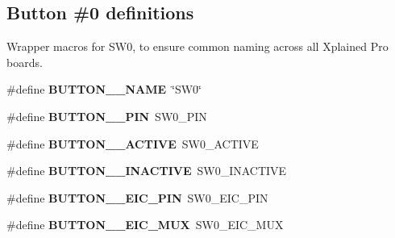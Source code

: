 \subsection*{Button \#0 definitions}
\label{_amgrpdb8ef24fb7da9ad0f7f88fb0a7d7347e}%
Wrapper macros for S\+W0, to ensure common naming across all Xplained Pro boards. \begin{DoxyCompactItemize}
\item 
\hypertarget{group__saml21__xplained__pro__features__group_ga20c6ec898ac72b49ab8e52d034ad1e2b}{}\#define {\bfseries B\+U\+T\+T\+O\+N\+\_\+\_\+\+N\+A\+M\+E}~\char`\"{}S\+W0\char`\"{}\label{group__saml21__xplained__pro__features__group_ga20c6ec898ac72b49ab8e52d034ad1e2b}

\item 
\hypertarget{group__saml21__xplained__pro__features__group_ga6cb077072b69f695f7bcc057da12919f}{}\#define {\bfseries B\+U\+T\+T\+O\+N\+\_\+\_\+\+P\+I\+N}~S\+W0\+\_\+\+P\+I\+N\label{group__saml21__xplained__pro__features__group_ga6cb077072b69f695f7bcc057da12919f}

\item 
\hypertarget{group__saml21__xplained__pro__features__group_gab2f863849e05ec54d451ac536f4b5031}{}\#define {\bfseries B\+U\+T\+T\+O\+N\+\_\+\_\+\+A\+C\+T\+I\+V\+E}~S\+W0\+\_\+\+A\+C\+T\+I\+V\+E\label{group__saml21__xplained__pro__features__group_gab2f863849e05ec54d451ac536f4b5031}

\item 
\hypertarget{group__saml21__xplained__pro__features__group_ga54119bf75db09e383bfd9c3571fc4efe}{}\#define {\bfseries B\+U\+T\+T\+O\+N\+\_\+\_\+\+I\+N\+A\+C\+T\+I\+V\+E}~S\+W0\+\_\+\+I\+N\+A\+C\+T\+I\+V\+E\label{group__saml21__xplained__pro__features__group_ga54119bf75db09e383bfd9c3571fc4efe}

\item 
\hypertarget{group__saml21__xplained__pro__features__group_gaa8d94c804e6a74a033e09e8267069fc5}{}\#define {\bfseries B\+U\+T\+T\+O\+N\+\_\+\_\+\+E\+I\+C\+\_\+\+P\+I\+N}~S\+W0\+\_\+\+E\+I\+C\+\_\+\+P\+I\+N\label{group__saml21__xplained__pro__features__group_gaa8d94c804e6a74a033e09e8267069fc5}

\item 
\hypertarget{group__saml21__xplained__pro__features__group_ga2b85ab2cdabcc349b8b6f9e8fa9ac119}{}\#define {\bfseries B\+U\+T\+T\+O\+N\+\_\+\_\+\+E\+I\+C\+\_\+\+M\+U\+X}~S\+W0\+\_\+\+E\+I\+C\+\_\+\+M\+U\+X\label{group__saml21__xplained__pro__features__group_ga2b85ab2cdabcc349b8b6f9e8fa9ac119}


\end{DoxyCompactItemize}
